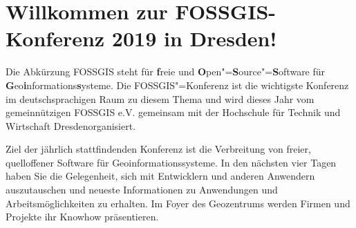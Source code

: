 \newpage
\section*{Willkommen zur FOSSGIS-Konferenz 2019 in Dresden!} \label{welcome}
Die Abkürzung { FOSSGIS} steht für {\bf f}reie und {\bf O}pen"={\bf S}ource"={\bf S}oftware für {\bf G}eo{\bf i}nformations{\bf s}ysteme.
Die FOSSGIS"=Konferenz ist die wichtigste Konferenz im deutschsprachigen Raum zu
diesem \mbox{Thema} und wird dieses Jahr vom gemeinnützigen FOSSGIS e.V.
gemeinsam mit der Hochschule für Technik und Wirtschaft Dresden\linebreak organisiert.

Ziel der jährlich stattfindenden Konferenz ist die Verbreitung von freier,
quelloffener Software für Geoinformationssysteme. In den nächsten vier Tagen
haben Sie die Gelegenheit, sich mit Entwicklern und anderen Anwendern
auszutauschen und \mbox{neueste} Informationen zu Anwendungen und
Arbeitsmöglichkeiten zu erhalten. Im Foyer des Geozentrums werden Firmen
und Projekte ihr Knowhow präsentieren.

\newpage


